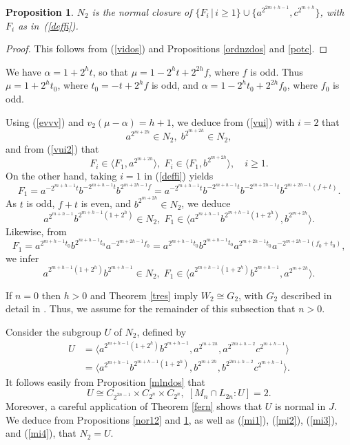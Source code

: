 \documentclass{amsart}
\newtheorem{prop}[theorem]{Proposition}
\theoremstyle{definition}
\theoremstyle{remark}
\begin{document}
{%


\begin{prop}
\label{mazda2} $N_2$ is the normal closure of $\{F_i\,|\, i\geq 1\}\cup\{a^{2^{2m+h-1}}, c^{2^{m+h}}\}$, 
with $F_i$ as in~(\ref{deffi}).
\end{prop}

\begin{proof} This follows from (\ref{vidos}) and Propositions \ref{ordnzdos} and \ref{potc}.
 \end{proof}


We have $\alpha=1+2^h t$, so that $\mu=1-2^h t+2^{2h} f$, where $f$ is odd. Thus $\mu=1+2^h t_0$,
where $t_0=-t+2^h f$ is odd, and  $\alpha=1-2^h t_0+2^{2h}f_0$, where $f_0$ is odd. 

Using (\ref{evvv}) and $v_2(\mu-\alpha)=h+1$,
we deduce from (\ref{vui}) with $i=2$ that
\begin{equation}
\label{mi1}
a^{2^{m+2h}}\in N_2,\; b^{2^{m+2h}}\in N_2,
\end{equation}
and from (\ref{vui2}) that
\begin{equation}
\label{mi2}
F_i\in \langle F_1, a^{2^{m+2h}}\rangle,\; F_i\in \langle F_1, b^{2^{m+2h}}\rangle,\quad i\geq 1.
\end{equation}
On the other hand, taking $i=1$ in (\ref{deffi}) yields
$$
F_1=a^{-2^{m+h-1}t} b^{-2^{m+h-1}t}b^{2^{m+2h-1}f}=a^{-2^{m+h-1}t} b^{-2^{m+h-1}t}b^{-2^{m+2h-1}t}b^{2^{m+2h-1}(f+t)}.
$$
As $t$ is odd, $f+t$ is even, and $b^{2^{m+2h}}\in N_2$, we deduce
\begin{equation}
\label{mi3}
a^{2^{m+h-1}} b^{2^{m+h-1}(1+2^h)}\in N_2,\; F_1\in \langle a^{2^{m+h-1}} b^{2^{m+h-1}(1+2^h)}, b^{2^{m+2h}} \rangle.
\end{equation}
Likewise, from
$$
F_1=a^{2^{m+h-1}t_0} b^{2^{m+h-1}t_0}a^{-2^{m+2h-1}f_0}=a^{2^{m+h-1}t_0} b^{2^{m+h-1}t_0}a^{2^{m+2h-1}t_0}a^{-2^{m+2h-1}(f_0+t_0)},
$$
we infer 
\begin{equation}
\label{mi4}
a^{2^{m+h-1}(1+2^h)} b^{2^{m+h-1}}\in N_2,\; F_1\in \langle a^{2^{m+h-1}(1+2^h)} b^{2^{m+h-1}}, a^{2^{m+2h}} \rangle.
\end{equation}


If $n=0$ then $h>0$ and Theorem \ref{tres} imply $W_2\cong G_2$, with $G_2$ described in detail in \cite{MS}.
Thus, we assume for the remainder of this subsection that $n>0$.

Consider the subgroup $U$ of $N_2$, defined by
$$
\begin{aligned}
U &=\langle a^{2^{m+h-1}(1+2^h)} b^{2^{m+h-1}}, a^{2^{m+2h}}, a^{2^{2m+h-2}}c^{2^{m+h-1}}\rangle\\
&=\langle a^{2^{m+h-1}} b^{2^{m+h-1}(1+2^h)}, b^{2^{m+2h}}, b^{2^{2m+h-2}}c^{2^{m+h-1}}\rangle.
\end{aligned}
$$
It follows easily from Proposition \ref{mlndos} that 
$$
U\cong C_{2^{2n-1}}\times C_{2^n}\times C_{2^n},\; [M_n\cap L_{2n}:U]=2.
$$
Moreover, a careful application of Theorem \ref{fern} shows that $U$ is normal in $J$. We deduce from
Propositions  \ref{nor12} and \ref{mazda2}, as well as (\ref{mi1}), (\ref{mi2}),  (\ref{mi3}), and (\ref{mi4}),
that $N_2=U$. %

}
\end{document}
